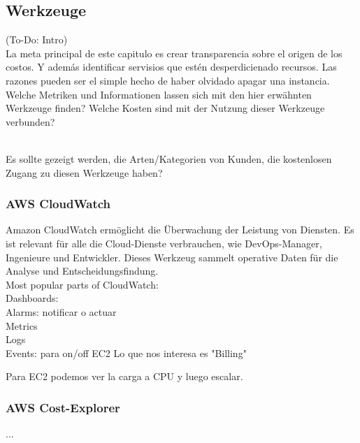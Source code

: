 \subsection{Werkzeuge}
(To-Do: Intro)\\

La meta principal de este capitulo es crear transparencia sobre el origen de los costos. Y además identificar servisios que estén desperdicienado recursos. Las razones pueden ser el simple hecho de haber olvidado apagar una instancia.
Welche Metriken und Informationen lassen sich mit den hier erwähnten Werkzeuge finden?
Welche Kosten sind mit der Nutzung dieser Werkzeuge verbunden?

\\
Es sollte gezeigt werden, die Arten/Kategorien von Kunden, die kostenlosen Zugang zu diesen Werkzeuge haben?


\subsubsection{AWS CloudWatch} 

Amazon CloudWatch ermöglicht die Überwachung der Leistung von Diensten. Es ist relevant für alle die Cloud-Dienste verbrauchen, wie DevOps-Manager, Ingenieure und Entwickler. Dieses Werkzeug sammelt operative Daten für die Analyse und Entscheidungsfindung.
\\
Most popular parts of CloudWatch:
\\
Dashboards: 
\\
Alarms: notificar o actuar
\\
Metrics
\\
Logs
\\
Events: para on/off EC2
Lo que nos interesa es "Billing"


Para EC2 podemos ver la carga a CPU y luego escalar.

\subsubsection{AWS Cost-Explorer}
...

